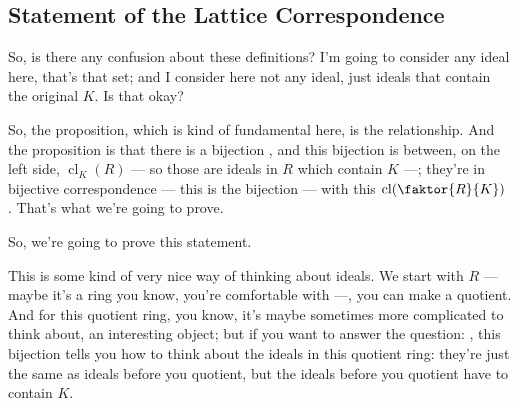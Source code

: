 \begin{content}
\end{content}

\subsection{Statement of the Lattice Correspondence}

\begin{speech}[00:18:40 - 00:20:07]
So, is there any confusion about these definitions? I'm going to consider any ideal here, that's that set; and I consider here not any ideal, just ideals that contain the original $K$. Is that okay?

So, the proposition, which is kind of fundamental here, is the relationship. And the proposition is that there is a bijection , and this bijection is between, on the left side, $\operatorname{cl}_K(R)$  --- so those are ideals in $R$ which contain $K$ ---; they're in bijective correspondence --- this is the bijection  --- with this $\operatorname{cl}(\faktor{R}{K})$ . That's what we're going to prove.

So, we're going to prove this statement.

This is some kind of very nice way of thinking about ideals. We start with $R$ --- maybe it's a ring you know, you're comfortable with ---, you can make a quotient. And for this quotient ring, you know, it's maybe sometimes more complicated to think about, an interesting object; but if you want to answer the question: , this bijection tells you how to think about the ideals in this quotient ring: they're just the same as ideals before you quotient, but the ideals before you quotient have to contain $K$.
\end{speech}

